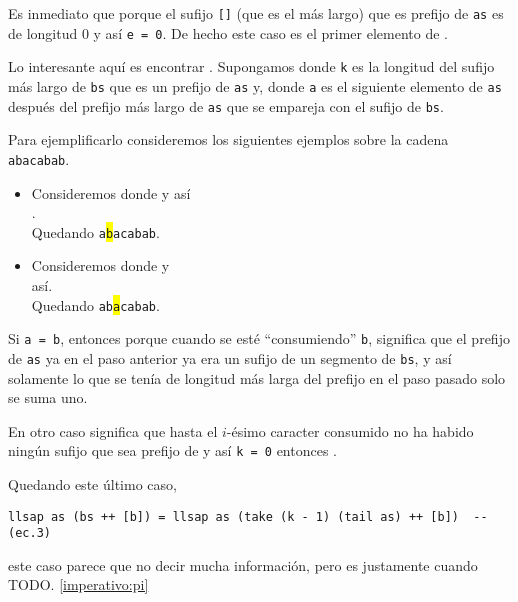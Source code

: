 Es inmediato que  porque el sufijo \texttt{[]} (que es el más largo) que
es prefijo de \texttt{as} es de longitud 0 y así \texttt{e = 0}. De hecho este caso es el primer
elemento de .

Lo interesante aquí es encontrar . Supongamos donde \texttt{k}
es la longitud del sufijo más largo de \texttt{bs} que es un prefijo de \texttt{as} y,
\label{funcional:func_error_a} donde \texttt{a} es el siguiente
elemento de \texttt{as} después del prefijo más largo de \texttt{as} que se empareja con el
sufijo de \texttt{bs}.

Para ejemplificarlo consideremos los siguientes ejemplos sobre la cadena \texttt{abacabab}.
\begin{itemize}
\item Consideremos donde y así\\
.\\
Quedando \texttt{a\colorbox{yellow}b}\texttt{acabab}.
\item Consideremos donde y\\
así.\\
Quedando \texttt{ab\colorbox{yellow}a}\texttt{cabab}.
\end{itemize}

Si \texttt{a = b}, entonces  porque cuando se esté
``consumiendo'' \texttt{b}, significa que el prefijo de \texttt{as} ya en el paso anterior ya era
un sufijo de un segmento de \texttt{bs}, y así solamente lo que se tenía de longitud más larga del
prefijo en el paso pasado solo se suma uno.

En otro caso significa que hasta el $i$-ésimo caracter consumido no ha habido ningún sufijo que sea
prefijo de y así \texttt{k = 0} entonces .

Quedando este último caso,
\begin{verbatim}
llsap as (bs ++ [b]) = llsap as (take (k - 1) (tail as) ++ [b])  -- (ec.3)
\end{verbatim}
este caso parece que no decir mucha información, pero es justamente cuando TODO.
\ref{imperativo:pi}

